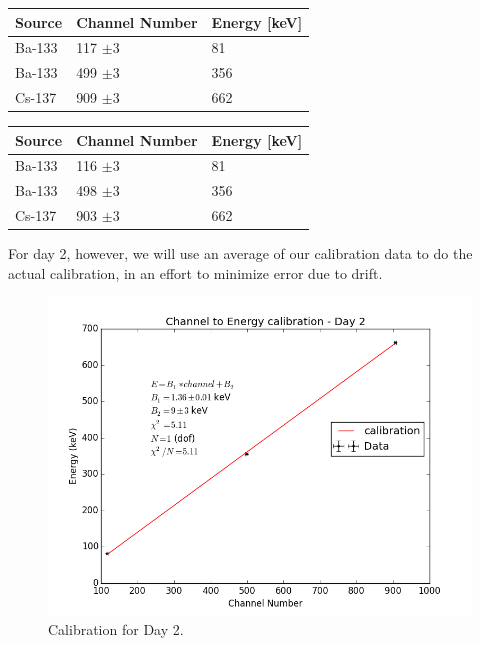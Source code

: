 \documentclass{article}
\begin{document}
\begin{center}
    \centering
     \label{tab:title} 
    \begin{tabular}{| l | l | l |}
    \hline
    Source & Channel Number & Energy [keV] \\ \hline
    Ba-133 & 117 $\pm 3$ & 81 \\ \hline
    Ba-133 & 499 $\pm 3$ & 356 \\ \hline
    Cs-137 & 909 $\pm 3$ & 662 \\ \hline
    \end{tabular}
\end{center}

\begin{center}
    \centering
     \label{tab:title} 
    \begin{tabular}{| l | l | l |}
    \hline
    Source & Channel Number & Energy [keV] \\ \hline
    Ba-133 & 116 $\pm 3$ & 81 \\ \hline
    Ba-133 & 498 $\pm 3$ & 356 \\ \hline
    Cs-137 & 903 $\pm 3$ & 662 \\ \hline
    \end{tabular}
\end{center}

For day 2, however, we will use an average of our calibration data to do the actual calibration, in an effort to minimize error due to drift.

\begin{figure}[!htb]
	\centering
	\includegraphics[scale=.75]{plots/cal2.png}
  	\caption{Calibration for Day 2.} 
 	\label{cal2}
\end{figure}
\end{document}
